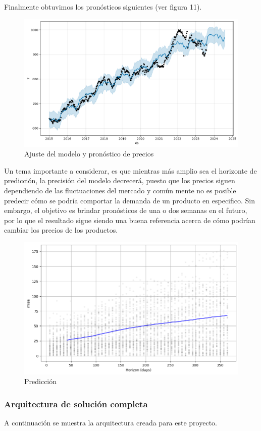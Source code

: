 \documentclass{article}
\begin{document}
\newpage
Finalmente obtuvimos los pronósticos siguientes (ver figura 11). 

\begin{figure}[h]
\centering
\includegraphics[width=0.9\linewidth]{Reports/images/pronostico.png}
\caption{\label{fig:pronostico} Ajuste del modelo y pronóstico de precios}
\end{figure}

Un tema importante a considerar, es que mientras más amplio sea el horizonte de predicción, la precisión del modelo decrecerá, puesto que los precios siguen dependiendo de las fluctuaciones del mercado y común mente no es posible predecir cómo se podría comportar la demanda de un producto en especifico. Sin embargo, el objetivo es brindar pronósticos de una o dos semanas en el futuro, por lo que el resultado sigue siendo una buena referencia acerca de cómo podrían cambiar los precios de los productos.


\begin{figure}[h]
\centering
\includegraphics[width=0.7\linewidth]{Reports/images/predict.png}
\caption{\label{fig:Architecture}Predicción}
\end{figure}


\newpage
\subsubsection{Arquitectura de solución completa}
A continuación se muestra la arquitectura creada para este proyecto.
\end{document}
